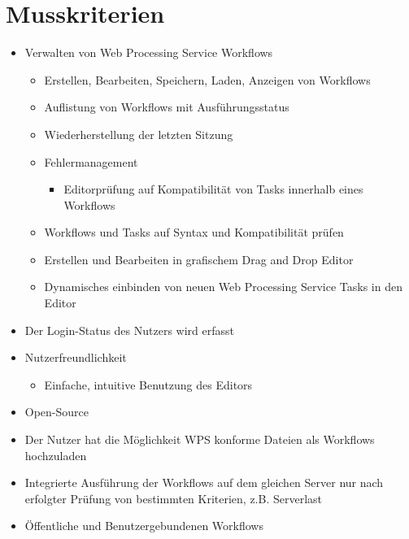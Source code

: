 		\section{Musskriterien}
			\begin{itemize}
				\item Verwalten von \gls{Web Processing Service} Workflows
					\begin{itemize}
						\item Erstellen, Bearbeiten, Speichern, Laden, Anzeigen von Workflows
						\item Auflistung von Workflows mit Ausführungsstatus
						\item Wiederherstellung der letzten Sitzung
						\item Fehlermanagement
						    \begin{itemize}
                            	\item Editorprüfung auf Kompatibilität von Tasks innerhalb eines Workflows
                            \end{itemize}
						\item Workflows und \Gls{Task}s auf Syntax und Kompatibilität prüfen
						\item Erstellen und Bearbeiten in grafischem \Gls{Drag and Drop} Editor
						\item Dynamisches einbinden von neuen \gls{Web Processing Service} Tasks in den Editor
					\end{itemize}
				\item Der Login-Status des Nutzers wird erfasst
				\item Nutzerfreundlichkeit
					\begin{itemize}
						\item Einfache, intuitive Benutzung des Editors
					\end{itemize}
				\item Open-Source
				\item Der Nutzer hat die Möglichkeit WPS konforme Dateien als Workflows hochzuladen
				\item Integrierte Ausführung der Workflows auf dem gleichen Server nur nach erfolgter Prüfung von bestimmten Kriterien, z.B. Serverlast
				\item Öffentliche und Benutzergebundenen Workflows

\end{itemize}
